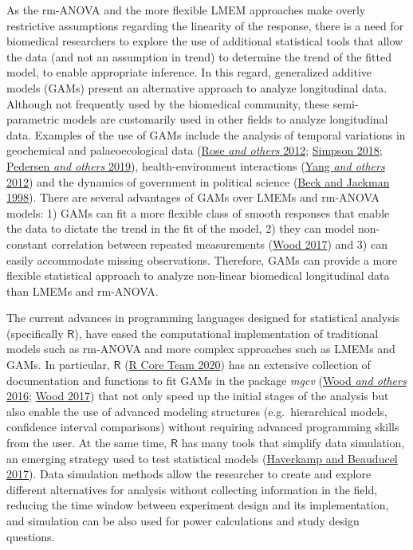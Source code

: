 \documentclass[
]{article}
\begin{document}
As the rm-ANOVA and the more flexible LMEM approaches make overly restrictive assumptions regarding the linearity of the response, there is a need for biomedical researchers to explore the use of additional statistical tools that allow the data (and not an assumption in trend) to determine the trend of the fitted model, to enable appropriate inference. In this regard, generalized additive models (GAMs) present an alternative approach to analyze longitudinal data. Although not frequently used by the biomedical community, these semi-parametric models are customarily used in other fields to analyze longitudinal data. Examples of the use of GAMs include the analysis of temporal variations in geochemical and palaeoecological data (\protect\hyperlink{ref-rose2012}{Rose \emph{and others} 2012}; \protect\hyperlink{ref-simpson2018}{Simpson 2018}; \protect\hyperlink{ref-pedersen2019}{Pedersen \emph{and others} 2019}), health-environment interactions (\protect\hyperlink{ref-yang2012}{Yang \emph{and others} 2012}) and the dynamics of government in political science (\protect\hyperlink{ref-beck1998}{Beck and Jackman 1998}). There are several advantages of GAMs over LMEMs and rm-ANOVA models: 1) GAMs can fit a more flexible class of smooth responses that enable the data to dictate the trend in the fit of the model, 2) they can model non-constant correlation between repeated measurements (\protect\hyperlink{ref-wood2017}{Wood 2017}) and 3) can easily accommodate missing observations. Therefore, GAMs can provide a more flexible statistical approach to analyze non-linear biomedical longitudinal data than LMEMs and rm-ANOVA.

The current advances in programming languages designed for statistical analysis (specifically \(\textsf{R}\)), have eased the computational implementation of traditional models such as rm-ANOVA and more complex approaches such as LMEMs and GAMs. In particular, \(\textsf{R}\) (\protect\hyperlink{ref-r}{R Core Team 2020}) has an extensive collection of documentation and functions to fit GAMs in the package \emph{mgcv} (\protect\hyperlink{ref-wood2016}{Wood \emph{and others} 2016}; \protect\hyperlink{ref-wood2017}{Wood 2017}) that not only speed up the initial stages of the analysis but also enable the use of advanced modeling structures (e.g.~hierarchical models, confidence interval comparisons) without requiring advanced programming skills from the user. At the same time, \(\textsf{R}\) has many tools that simplify data simulation, an emerging strategy used to test statistical models (\protect\hyperlink{ref-haverkamp2017}{Haverkamp and Beauducel 2017}). Data simulation methods allow the researcher to create and explore different alternatives for analysis without collecting information in the field, reducing the time window between experiment design and its implementation, and simulation can be also used for power calculations and study design questions.
\end{document}
